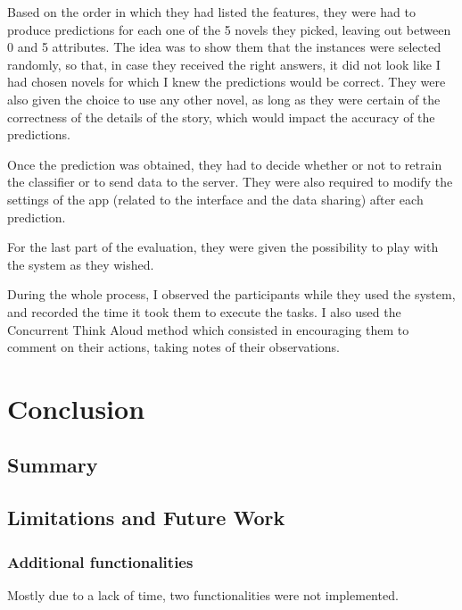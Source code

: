 \documentclass{mproj}
\begin{document}
Based on the order in which they had listed the features, they were had to produce predictions for each one of the 5 novels they picked, leaving out between 0 and 5 attributes. The idea was to show them that the instances were selected randomly, so that, in case they received the right answers, it did not look like I had chosen novels for which I knew the predictions would be correct. They were also given the choice to use any other novel, as long as they were certain of the correctness of the details of the story, which would impact the accuracy of the predictions. \par 

Once the prediction was obtained, they had to decide whether or not to retrain the classifier or to send data to the server. They were also required to modify the settings of the app (related to the interface and the data sharing) after each prediction. \par

For the last part of the evaluation, they were given the possibility to play with the system as they wished.\par

During the whole process, I observed the participants while they used the system, and recorded the time it took them to execute the tasks. I also used the Concurrent Think Aloud method \cite{usabilitytest} which consisted in encouraging them to comment on their actions, taking notes of their observations.


\chapter{Conclusion}\label{conclusion}

\section{Summary}

\section{Limitations and Future Work}

\subsection*{Additional functionalities}

\hspace{5mm} Mostly due to a lack of time, two functionalities were not implemented.\par
\end{document}
